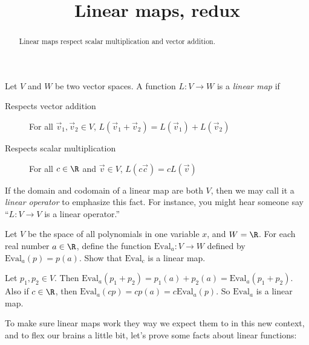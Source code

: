 \documentclass{ximera}
\title{Linear maps, redux}
\begin{document}
\begin{abstract}
  Linear maps respect scalar multiplication and vector addition.
\end{abstract}

\begin{definition}
  Let $V$ and $W$ be two vector spaces.  A function $L: V \to W$ is a \textit{linear map} if 
  \begin{description}
  \item[Respects vector addition] For all $\vec{v}_1,\vec{v}_2 \in V$, $L(\vec{v}_1+\vec{v}_2) = L(\vec{v}_1)+L(\vec{v}_2)$
  \item[Respects scalar multiplication] For all $c \in \R$ and $\vec{v} \in V$, $L(c\vec{c}) = cL(\vec{v})$
  \end{description}
\end{definition}

If the domain and codomain of a linear map are both $V$, then we may
call it a \textit{linear operator} to emphasize this fact.  For
instance, you might hear someone say ``$L : V \to V$ is a linear
operator.''

Let $V$ be the space of all polynomials in one variable $x$, and $W =
\R$.  For each real number $a \in \R$, define the function $\text{Eval}_a: V
\to W$ defined by $\text{Eval}_a(p) = p(a)$.  Show that $\text{Eval}_c$ is a linear
map.

\begin{free-response}	
  Let $p_1, p_2 \in V$.  Then $\text{Eval}_a(p_1+p_2)  = p_1(a)+p_2(a) = \text{Eval}_a(p_1+p_2)$.  Also if $c \in \R$, then $\text{Eval}_a(cp) = cp(a) = c\text{Eval}_a(p)$.  So $\text{Eval}_a$
  is a linear map.
\end{free-response}




To make sure linear maps work they way we expect them to in this new context, and to flex our brains a little bit, let's prove some facts about linear functions:
\end{document}
